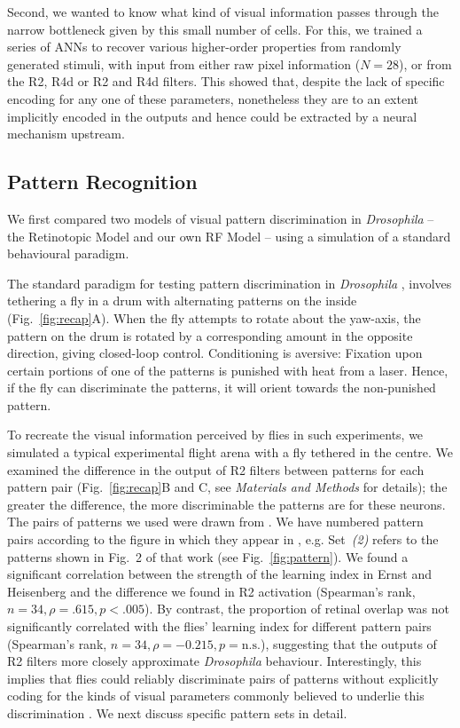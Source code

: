 Second, we wanted to know what kind of visual information passes through the narrow bottleneck given by this small number of cells.
For this, we trained a series of \acp{ANN} to recover various higher-order properties from randomly generated stimuli, with input from either raw pixel information ($N=28$), or from the R2, R4d or R2 and R4d filters.
This showed that, despite the lack of specific encoding for any one of these parameters, nonetheless they are to an extent implicitly encoded in the outputs and hence could be extracted by a neural mechanism upstream.

\subsection{Pattern Recognition}
We first compared two models of visual pattern discrimination in \emph{Drosophila} -- the Retinotopic Model \cite{Dill1995,Dill1993} and our own RF Model -- using a simulation of a standard behavioural paradigm.

The standard paradigm for testing pattern discrimination in \emph{Drosophila} \cite{Pan2009,Liu2006,Ernst1999,Dill1993}, involves tethering a fly in a drum with alternating patterns on the inside (Fig.~\ref{fig:recap}A).
When the fly attempts to rotate about the yaw-axis, the pattern on the drum is rotated by a corresponding amount in the opposite direction, giving closed-loop control.
Conditioning is aversive: Fixation upon certain portions of one of the patterns is punished with heat from a laser.
Hence, if the fly can discriminate the patterns, it will orient towards the non-punished pattern.

To recreate the visual information perceived by flies in such experiments, we simulated a typical experimental flight arena with a fly tethered in the centre.
We examined the difference in the output of R2 filters between patterns for each pattern pair (Fig.~\ref{fig:recap}B and C, see \emph{Materials and Methods} for details); the greater the difference, the more discriminable the patterns are for these neurons.
The pairs of patterns we used were drawn from \cite{Ernst1999}.
We have numbered pattern pairs according to the figure in which they appear in \cite{Ernst1999}, e.g. Set~\emph{(2)} refers to the patterns shown in Fig.~2 of that work (see Fig.~\ref{fig:pattern}).
We found a significant correlation between the strength of the learning index in Ernst and Heisenberg \cite{Ernst1999} and the difference we found in R2 activation (Spearman's rank, $n=34, \rho=.615, p<.005$).
By contrast, the proportion of retinal overlap was not significantly correlated with the flies' learning index for different pattern pairs (Spearman's rank, $n=34, \rho= -0.215, p=\mathrm{n.s.}$), suggesting that the outputs of R2 filters more closely approximate \emph{Drosophila} behaviour.
Interestingly, this implies that flies could reliably discriminate pairs of patterns without explicitly coding for the kinds of visual parameters commonly believed to underlie this discrimination \cite{Pan2009,Liu2006,Ernst1999}.
We next discuss specific pattern sets in detail.

